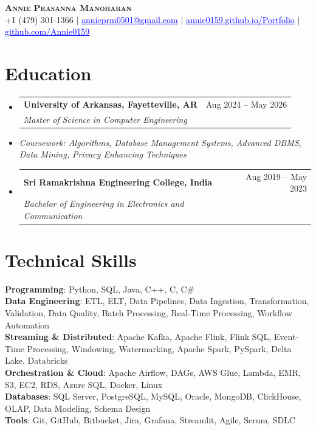 \documentclass[letterpaper,10pt]{article}
\makeatletter
\newcommand{\resumeSubheading}[4]{
  \vspace{1pt}\item
    \begin{tabular*}{0.985\textwidth}[t]{l@{\extracolsep{\fill}}r}
      \textbf{#1} & #2 \\
      \textit{\small#3} & \textit{\small #4} \\
    \end{tabular*}\vspace{1pt}
}
\newcommand{\resumeProjectLine}[1]{
  \vspace{1pt}\item[]{\small\textit{#1}}\vspace{2pt}
}
\newcommand{\resumeSubHeadingListStart}{\begin{itemize}[leftmargin=0.0in, label={}]}
\newcommand{\resumeSubHeadingListEnd}{\end{itemize}\vspace{-2pt}}
\makeatother
\begin{document}
\begin{center}
    \textbf{\Large \scshape Annie Prasanna Manoharan} \\ \vspace{2pt}
    \small +1 (479) 301-1366 $|$
    \href{mailto:annieprm0501@gmail.com}{\textcolor{blue}{\underline{annieprm0501@gmail.com}}} $|$
    \href{https://annie0159.github.io/Portfolio/}{\textcolor{blue}{\underline{annie0159.github.io/Portfolio}}} $|$
    \href{https://github.com/Annie0159}{\textcolor{blue}{\underline{github.com/Annie0159}}}
\end{center}
\vspace{-6pt}

\section{Education}
  \resumeSubHeadingListStart
    \resumeSubheading
      {University of Arkansas, Fayetteville, AR}{Aug 2024 -- May 2026}
      {Master of Science in Computer Engineering}{}
    \resumeProjectLine{Coursework: Algorithms, Database Management Systems, Advanced DBMS, Data Mining, Privacy Enhancing Techniques}
    \resumeSubheading
      {Sri Ramakrishna Engineering College, India}{Aug 2019 -- May 2023}
      {Bachelor of Engineering in Electronics and Communication}{}
  \resumeSubHeadingListEnd

\section{Technical Skills}
\begin{itemize}[leftmargin=0.0in, label={}]
    \small{\item{
        \textbf{Programming}{: Python, SQL, Java, C++, C, C\#} \\
        \textbf{Data Engineering}{: ETL, ELT, Data Pipelines, Data Ingestion, Transformation, Validation, Data Quality, Batch Processing, Real-Time Processing, Workflow Automation} \\
        \textbf{Streaming \& Distributed}{: Apache Kafka, Apache Flink, Flink SQL, Event-Time Processing, Windowing, Watermarking, Apache Spark, PySpark, Delta Lake, Databricks} \\
        \textbf{Orchestration \& Cloud}{: Apache Airflow, DAGs, AWS Glue, Lambda, EMR, S3, EC2, RDS, Azure SQL, Docker, Linux} \\
        \textbf{Databases}{: SQL Server, PostgreSQL, MySQL, Oracle, MongoDB, ClickHouse, OLAP, Data Modeling, Schema Design} \\
        \textbf{Tools}{: Git, GitHub, Bitbucket, Jira, Grafana, Streamlit, Agile, Scrum, SDLC}
    }}
\end{itemize}
\vspace{-4pt}
\end{document}
